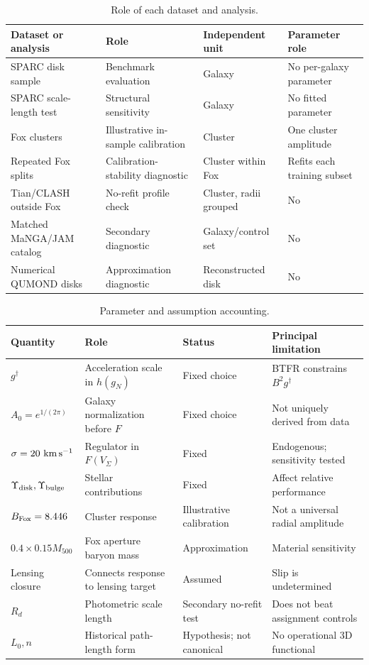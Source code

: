 \documentclass[aps,prd,reprint,superscriptaddress,showpacs,floatfix,longbibliography]{revtex4-2}
\begin{document}
\begin{table}[t]
\caption{\label{tab:roles}Role of each dataset and analysis.}
\begin{ruledtabular}
\begin{tabular}{llll}
Dataset or analysis & Role & Independent unit & Parameter role\\
\hline
SPARC disk sample & Benchmark evaluation & Galaxy & No per-galaxy parameter\\
SPARC scale-length test & Structural sensitivity & Galaxy & No fitted parameter\\
Fox clusters & Illustrative in-sample calibration & Cluster & One cluster amplitude\\
Repeated Fox splits & Calibration-stability diagnostic & Cluster within Fox & Refits each training subset\\
Tian/CLASH outside Fox & No-refit profile check & Cluster, radii grouped & No\\
Matched MaNGA/JAM catalog & Secondary diagnostic & Galaxy/control set & No\\
Numerical QUMOND disks & Approximation diagnostic & Reconstructed disk & No\\
\end{tabular}
\end{ruledtabular}
\end{table}

\begin{table}[t]
\caption{\label{tab:parameters}Parameter and assumption accounting.}
\begin{ruledtabular}
\begin{tabular}{llll}
Quantity & Role & Status & Principal limitation\\
\hline
$g^\dagger$ & Acceleration scale in $h(g_N)$ & Fixed choice & BTFR constrains $B^2g^\dagger$\\
$A_0=e^{1/(2\pi)}$ & Galaxy normalization before $F$ & Fixed choice & Not uniquely derived from data\\
$\sigma=20\ {\rm km\,s^{-1}}$ & Regulator in $F(V_\Sigma)$ & Fixed & Endogenous; sensitivity tested\\
$\Upsilon_{\rm disk},\Upsilon_{\rm bulge}$ & Stellar contributions & Fixed & Affect relative performance\\
$B_{\rm Fox}=8.446$ & Cluster response & Illustrative calibration & Not a universal radial amplitude\\
$0.4\times0.15M_{500}$ & Fox aperture baryon mass & Approximation & Material sensitivity\\
Lensing closure & Connects response to lensing target & Assumed & Slip is undetermined\\
$R_d$ & Photometric scale length & Secondary no-refit test & Does not beat assignment controls\\
$L_0,n$ & Historical path-length form & Hypothesis; not canonical & No operational 3D functional\\
\end{tabular}
\end{ruledtabular}
\end{table}
\end{document}
